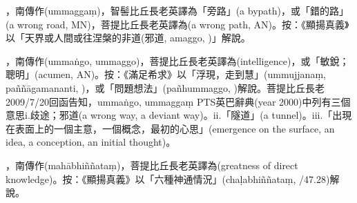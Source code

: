 \startitemgroup[noteitems]
\item{}，南傳作(ummaggaṃ)，智髻比丘長老英譯為「旁路」(a bypath)，或「錯的路」(a wrong road, MN)，菩提比丘長老英譯為(a wrong path, AN)。按：《顯揚真義》以「天界或人間或往涅槃的非道(邪道, amaggo, )」解說。
\item{}，南傳作(ummaṅgo, ummaggo)，菩提比丘長老英譯為(intelligence)，或「敏銳；聰明」(acumen, AN)。按：《滿足希求》以「浮現，走到慧」(ummujjanaṃ, paññāgamananti, )，或「問題想法」(pañhummaggo, )解說。菩提比丘長老2009/7/20回函告知，ummaṅgo, ummaggaṃ PTS英巴辭典(year 2000)中列有三個意思i.歧途；邪道(a wrong way, a deviant way)。ii.「隧道」(a tunnel)。iii.「出現在表面上的一個主意，一個概念，最初的心思」(emergence on the surface, an idea, a conception, an initial thought)。
\stopitemgroup

\startitemgroup[noteitems]
\item{}，南傳作(mahābhiññataṃ)，菩提比丘長老英譯為(greatness of direct knowledge)。按：《顯揚真義》以「六種神通情況」(chaḷabhiññataṃ, /47.28)解說。
\stopitemgroup

